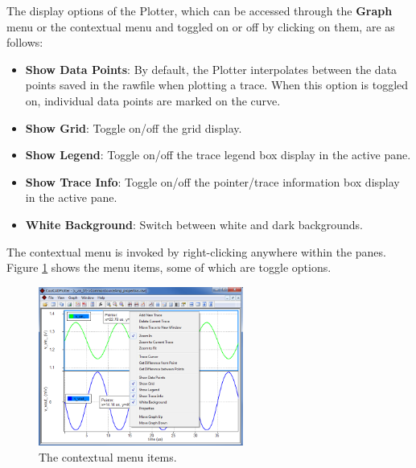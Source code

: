 The display options of the Plotter, which can be accessed through the \textsf{\textbf{Graph}} menu or the contextual menu and toggled on or off by clicking on them, are as follows:
\begin{itemize}
\item \textsf{\textbf{Show Data Points}}: By default, the Plotter interpolates between the data points saved in the rawfile when plotting a trace.  When this option is toggled on, individual data points are marked on the curve.
\item \textsf{\textbf{Show Grid}}: Toggle on/off the grid display.
\item \textsf{\textbf{Show Legend}}: Toggle on/off the trace legend box display in the active pane.
\item \textsf{\textbf{Show Trace Info}}: Toggle on/off the pointer/trace information box display in the active pane.
\item \textsf{\textbf{White Background}}: Switch between white and dark backgrounds.
\end{itemize}

The contextual menu is invoked by right-clicking anywhere within the panes.  Figure \ref{fig_plotter_contextualmenu} shows the menu items, some of which are toggle options.

\begin{figure}
    \includegraphics[width=0.6\textwidth]{./figures/plotter_netlist_editor_figures/Plotter_ContextualMenu.png}
    \caption{{The contextual menu items.}}
  \label{fig_plotter_contextualmenu}
\end{figure}


